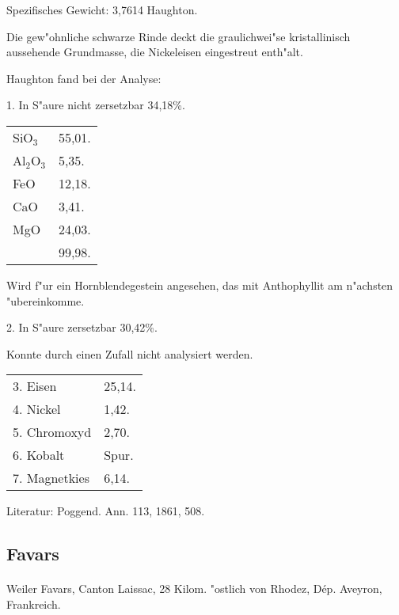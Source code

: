 \documentclass[a4paper, 11pt, oneside]{article}
\begin{document}
Spezifisches Gewicht: 3,7614 Haughton.

Die gew"ohnliche schwarze Rinde deckt die graulichwei"se kristallinisch aussehende Grundmasse, die Nickeleisen eingestreut enth"alt.

Haughton fand bei der Analyse:
\begin{center}
1. In S"aure nicht zersetzbar 34,18\%.
\end{center}

\begin{table}[H]
    \centering
    \begin{tabular}{l l}
        SiO$_{3}$ & 55,01. \\
        Al$_{2}$O$_{3}$ & 5,35. \\
        FeO & 12,18. \\
        CaO & 3,41. \\
        MgO & 24,03. \\
         & 99,98. \\
    \end{tabular}
\end{table}

Wird f"ur ein Hornblendegestein angesehen, das mit Anthophyllit am n"achsten "ubereinkomme.

\begin{center}
2. In S"aure zersetzbar 30,42\%.
\end{center}

Konnte durch einen Zufall nicht analysiert werden.

\begin{table}[H]
    \centering
    \begin{tabular}{l l}
        3. Eisen & 25,14. \\
        4. Nickel & 1,42. \\
        5. Chromoxyd & 2,70. \\
        6. Kobalt & Spur. \\
        7. Magnetkies & 6,14. \\
    \end{tabular}
\end{table}

\footnotesize
Literatur: Poggend. Ann. 113, 1861, 508.

\subsection{Favars}
\normalsize
\paragraph{}
Weiler Favars, Canton Laissac, 28 Kilom. "ostlich von Rhodez, Dép. Aveyron, Frankreich.
\end{document}
